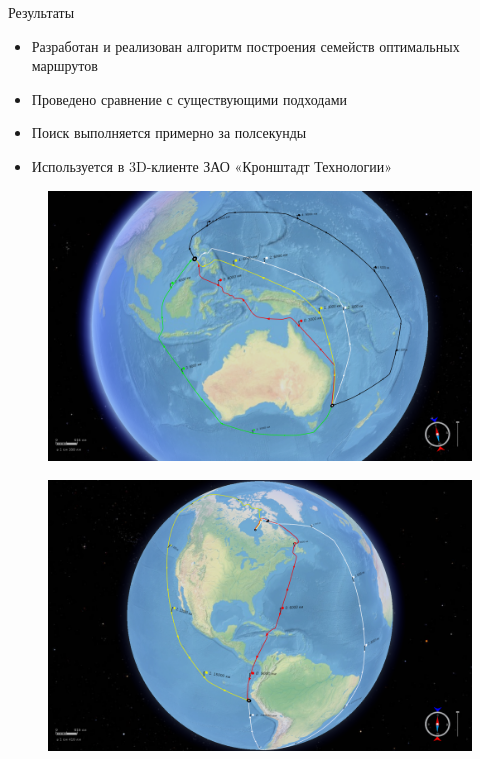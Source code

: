 \documentclass[russian, hyperref={unicode}]{beamer}
\theoremstyle{definition}
\begin{document}
\begin{frame}{Результаты}
     {
        \begin{itemize}
            \item Разработан и реализован алгоритм построения семейств оптимальных маршрутов 
            \item Проведено сравнение с существующими подходами 
            \item Поиск выполняется примерно за полсекунды 
            \item Используется в 3D-клиенте ЗАО «Кронштадт Технологии»
        \end{itemize}
    }
     {
        \begin{figure}
            \includegraphics[width=\textwidth]{results/1}
        \end{figure}
    }

     {
        \begin{figure}
            \includegraphics[width=\textwidth]{results/2}
        \end{figure}
    }


\end{frame}
\end{document}
